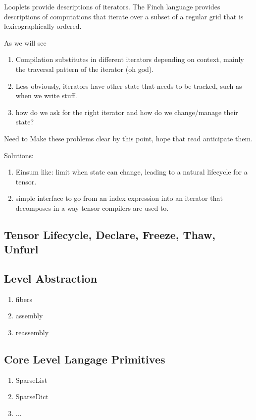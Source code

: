 Looplets provide descriptions of iterators. 
%
The Finch language provides descriptions of computations that iterate over a subset of a regular grid that is lexicographically ordered.

%
As we will see
\begin{enumerate}
    \item Compilation substitutes in different iterators depending on context, mainly the traversal pattern of the iterator (oh god).
    \item Less obviously, iterators have other state that needs to be tracked, such as when we write stuff.
    \item how do we ask for the right iterator and how do we change/manage their state?
\end{enumerate}
Need to Make these problems clear by this point, hope that read anticipate them.

Solutions:
\begin{enumerate}
    \item Einsum like: limit when state can change, leading to a natural lifecycle for a tensor.
    \item simple interface to go from an index expression into an iterator that decomposes in a way tensor compilers are used to.
\end{enumerate}

\subsection{Tensor Lifecycle, Declare, Freeze, Thaw, Unfurl}


\subsection{Level Abstraction}
    
\begin{enumerate}
\item fibers
\item assembly
\item reassembly
\end{enumerate}


\subsection{Core Level Langage Primitives}
\begin{enumerate}
\item SparseList
\item SparseDict
\item ...
\end{enumerate}
